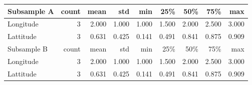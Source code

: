 \begin{tabular}{lrrrrrrrr}
\toprule
Subsample A &  count &  mean &   std &   min &  25\% &  50\% &  75\% &   max \\
\midrule
Longitude &      3 & 2.000 & 1.000 & 1.000 & 1.500 & 2.000 & 2.500 & 3.000 \\
Lattitude &      3 & 0.631 & 0.425 & 0.141 & 0.491 & 0.841 & 0.875 & 0.909 \\
\midrule
Subsample B &  count &  mean &   std &   min &  25\% &  50\% &  75\% &   max \\
\midrule
Longitude &      3 & 2.000 & 1.000 & 1.000 & 1.500 & 2.000 & 2.500 & 3.000 \\
Lattitude &      3 & 0.631 & 0.425 & 0.141 & 0.491 & 0.841 & 0.875 & 0.909 \\
\bottomrule
\end{tabular}
